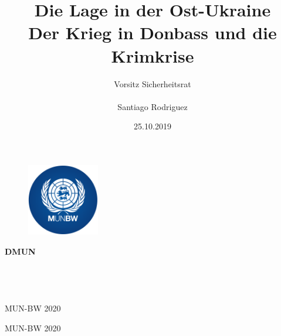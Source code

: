 \documentclass[a4paper,11pt]{article}
\title{Die Lage in der Ost-Ukraine \\ Der Krieg in Donbass und die Krimkrise}
\author{Vorsitz Sicherheitsrat \\ \\ Santiago Rodriguez}
\date{25.10.2019}
\begin{document}
	\begin{titlepage}
		\thispagestyle{empty}
		\begin{figure}
			\includegraphics[width=31.5mm,right]{./munbwlogo.png}
		\end{figure}
		\vspace*{-43mm}\hspace{-6mm}\textbf{\textcolor{pantone294}{\large{DMUN}}}\\\\\\\\\\
		\textcolor{pantone294}{MUN-BW 2020}\\
		\vspace{30mm}
		\begin{center}
			\textcolor{pantone294}{\huge{MUN-BW 2020}}\\\vspace*{7mm}
			\textcolor{pantone294}{\huge{\textbf{\thetitle}}}\\\vspace*{10mm}
			\textcolor{pantone294}{\theauthor}\\\vspace*{10mm}
			\textcolor{pantone294}{\thedate}\\\vspace*{20mm}
		\end{center}
	\end{titlepage}
	\makeatother
	\restoregeometry
	\newpage
	
	\tableofcontents
\vspace{2cm}
	
	
\end{document}
